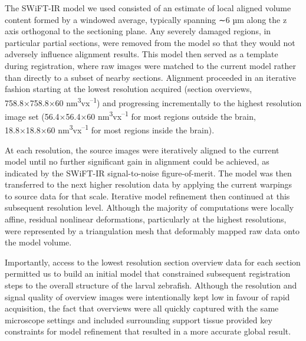 \documentclass{article}
\begin{document}
The SWiFT-IR model we used consisted of an estimate of local aligned volume content formed by a windowed average, typically spanning ∼6 µm along the z axis orthogonal to the sectioning plane. Any severely damaged regions, in particular partial sections, were removed from the model so that they would not adversely influence alignment results. This model then served as a template during registration, where raw images were matched to the current model rather than directly to a subset of nearby sections. Alignment proceeded in an iterative fashion starting at the lowest resolution acquired (section overviews, 758.8×758.8×60 nm\textsuperscript{3}vx\textsuperscript{–1}) and progressing incrementally to the highest resolution image set (56.4×56.4×60 nm\textsuperscript{3}vx\textsuperscript{–1} for most regions outside the brain, 18.8×18.8×60 nm\textsuperscript{3}vx\textsuperscript{–1} for most regions inside the brain).

At each resolution, the source images were iteratively aligned to the current model until no further significant gain in alignment could be achieved, as indicated by the SWiFT-IR signal-to-noise figure-of-merit. The model was then transferred to the next higher resolution data by applying the current warpings to source data for that scale. Iterative model refinement then continued at this subsequent resolution level. Although the majority of computations were locally affine, residual nonlinear deformations, particularly at the highest resolutions, were represented by a triangulation mesh that deformably mapped raw data onto the model volume.

Importantly, access to the lowest resolution section overview data for each section permitted us to build an initial model that constrained subsequent registration steps to the overall structure of the larval zebrafish. Although the resolution and signal quality of overview images were intentionally kept low in favour of rapid acquisition, the fact that overviews were all quickly captured with the same microscope settings and included surrounding support tissue provided key constraints for model refinement that resulted in a more accurate global result.
\end{document}
